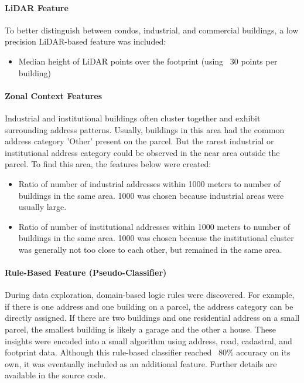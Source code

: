 \documentclass[11pt]{article}
\begin{document}
\paragraph{LiDAR Feature}
To better distinguish between condos, industrial, and commercial buildings, a low precision LiDAR-based feature was included:

\begin{itemize}
    \item Median height of LiDAR points over the footprint (using ~30 points per building)
\end{itemize}

\paragraph{Zonal Context Features}
Industrial and institutional buildings often cluster together and exhibit surrounding address patterns. Usually, buildings in this area had the common address category ’Other’ present on the parcel. But the rarest industrial or institutional address category could be observed in the near area outside the parcel. To find this area, the features below were created:

\begin{itemize}
    \item Ratio of number of industrial addresses within 1000 meters to number of buildings in the same area. 1000 was chosen because industrial areas were usually large.
    \item Ratio of number of institutional addresses within 1000 meters to number of buildings in the same area. 1000 was chosen because the institutional cluster was generally not too close to each other, but remained in the same area.
\end{itemize}

\paragraph{Rule-Based Feature (Pseudo-Classifier)}
During data exploration, domain-based logic rules were discovered. For example, if there is one address and one building on a parcel, the address category can be directly assigned. If there are two buildings and one residential address on a small parcel, the smallest building is likely a garage and the other a house. These insights were encoded into a small algorithm using address, road, cadastral, and footprint data. Although this rule-based classifier reached ~80\% accuracy on its own, it was eventually included as an additional feature. Further details are available in the source code.
\end{document}

